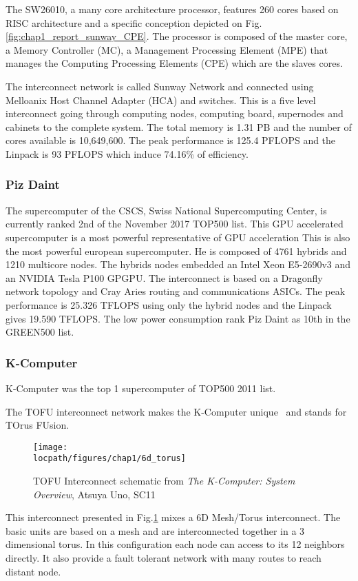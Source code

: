 The SW26010, a many core architecture processor, features 260 cores based on RISC architecture and a specific conception depicted on Fig.\ref{fig:chap1_report_sunway_CPE}. 
The processor is composed of the master core, a Memory Controller (MC), a Management Processing Element (MPE) that manages the Computing Processing Elements (CPE) which are the slaves cores. 

The interconnect network is called Sunway Network and connected using Melloanix Host Channel Adapter (HCA) and switches. 
This is a five level interconnect going through computing nodes, computing board, supernodes and cabinets to the complete system.
The total memory is 1.31 PB and the number of cores available is 10,649,600.
The peak performance is 125.4 PFLOPS and the Linpack is 93 PFLOPS which induce 74.16\% of efficiency. 

\subsubsection{Piz Daint}
The supercomputer of the CSCS, Swiss National Supercomputing Center, is currently ranked 2nd of the November 2017 TOP500 list. 
This GPU accelerated supercomputer is a most powerful representative of GPU acceleration
This is also the most powerful european supercomputer. 
He is composed of 4761 hybrids and 1210 multicore nodes. 
The hybrids nodes embedded an Intel Xeon E5-2690v3 and an NVIDIA Tesla P100 GPGPU. 
The interconnect is based on a Dragonfly network topology and Cray Aries routing and communications ASICs. 
The peak performance is 25.326 TFLOPS using only the hybrid nodes and the Linpack gives 19.590 TFLOPS.
The low power consumption rank Piz Daint as 10th in the GREEN500 list. 

\subsubsection{K-Computer}
K-Computer was the top 1 supercomputer of TOP500 2011 list. 

The TOFU interconnect network makes the K-Computer unique~\cite{ajima2009tofu} and stands for TOrus FUsion.

\begin{figure}
\begin{center}
\texttt{[image: \\locpath/figures/chap1/6d\_torus]}
\end{center}
\caption{TOFU Interconnect schematic from \textit{The K-Computer: System Overview}, Atsuya Uno, SC11}
\label{fig:1_HPC:tofu}
\end{figure}
This interconnect presented in Fig.\ref{fig:1_HPC:tofu} mixes a 6D Mesh/Torus interconnect.
The basic units are based on a mesh and are interconnected together in a 3 dimensional torus. 
In this configuration each node can access to its 12 neighbors directly. 
It also provide a fault tolerant network with many routes to reach distant node. 


